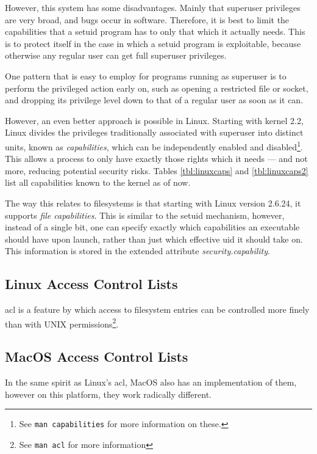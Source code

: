 \documentclass[a4paper]{article}
\begin{document}
However, this system has some disadvantages. Mainly that superuser privileges are very broad, and bugs occur in software. Therefore, it is best to limit the capabilities that a setuid program has to only that which it actually needs. This is to protect itself in the case in which a setuid program is exploitable, because otherwise any regular user can get full superuser privileges.

One pattern that is easy to employ for programs running as superuser is to perform the privileged action early on, such as opening a restricted file or socket, and dropping its privilege level down to that of a regular user as soon as it can. 

However, an even better approach is possible in Linux. Starting  with  kernel  2.2, Linux divides the privileges traditionally associated with superuser into distinct units, known as \emph{capabilities}, which can be independently enabled and disabled\footnote{See \texttt{man capabilities} for more information on these.}. This allows a process to only have exactly those rights which it needs — and not more, reducing potential security risks. Tables \ref{tbl:linuxcaps} and \ref{tbl:linuxcaps2} list all capabilities known to the kernel as of now.

The way this relates to filesystems is that starting with Linux version 2.6.24, it supports \emph{file capabilities}. This is similar to the setuid mechanism, however, instead of a single bit, one can specify exactly which capabilities an executable should have upon launch, rather than just which effective \gls{uid} it should take on. This information is stored in the extended attribute \emph{security.capability}.



\subsection{Linux Access Control Lists}

\gls{acl} is a feature by which access to filesystem entries can be controlled more finely than with UNIX permissions\footnote{See \texttt{man acl} for more information}.

\subsection{MacOS Access Control Lists}

In the same spirit as Linux's \gls{acl}, MacOS also has an implementation of them, however on this platform, they work radically different.
\end{document}
